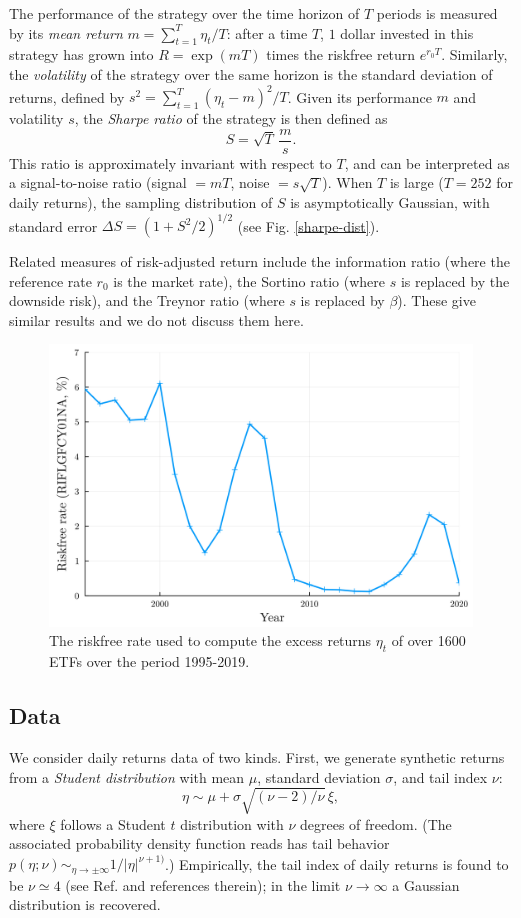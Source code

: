 \documentclass[
reprint,
amsmath,amssymb,
aps,
]{revtex4-2}
\begin{document}
The performance of the strategy over the time horizon of $T$ periods is measured by its \emph{mean return} $m = \sum_{t=1}^T \eta_{t}/T$: after a time $T$, $1$ dollar invested in this strategy has grown into $R = \exp(mT)$ times the riskfree return $e^{r_0T}$. 
Similarly, the \emph{volatility} of the strategy over the same horizon is the standard deviation of returns, defined by $s^2 = \sum_{t=1}^T (\eta_{t} - m)^2/T$.
Given its performance $m$ and volatility $s$, the \emph{Sharpe ratio} of the strategy is then defined as 
\begin{equation}
    S = \sqrt{T}\, \frac{m}{s}.    
\end{equation}
This ratio is approximately invariant with respect to $T$, and can be interpreted as a signal-to-noise ratio (signal $=mT$, noise $=s\sqrt{T}$). When $T$ is large ($T = 252$ for daily returns), the sampling distribution of $S$ is asymptotically Gaussian, with standard error $\Delta S = (1+S^2/2)^{1/2}$ \cite{loStatistics2002} (see Fig. \ref{sharpe-dist}).

Related measures of risk-adjusted return include the information ratio (where the reference rate $r_0$ is the market rate), the Sortino ratio (where $s$ is replaced by the downside risk), and the Treynor ratio (where $s$ is replaced by $\beta$). These give similar results and we do not discuss them here.  


\begin{figure}[t!]
    \includegraphics[width = .45\textwidth]{riskfree-rate.png}
    \caption{The riskfree rate used to compute the excess returns $\eta_t$ of over 1600 ETFs over the period 1995-2019.}
    \label{riskfree-rate}
\end{figure}

\subsection{Data}

We consider daily returns data of two kinds. First, we generate synthetic returns from a \emph{Student distribution} with mean $\mu$, standard deviation $\sigma$, and tail index $\nu$:
\begin{equation}
    \eta \sim \mu + \sigma\sqrt{(\nu - 2)/\nu}\, \xi,
\end{equation}
where $\xi$ follows a Student $t$ distribution with $\nu$ degrees of freedom. (The associated probability density function reads has tail behavior $p(\eta; \nu)\sim_{\eta\to\pm\infty} 1/\vert\eta\vert^{\nu + 1)}$.) 
Empirically, the tail index of daily returns is found to be $\nu\simeq 4$ (see Ref. \cite{bouchaudTheory2003} and references therein); in the limit $\nu\to\infty$ a Gaussian distribution is recovered. 
\end{document}
